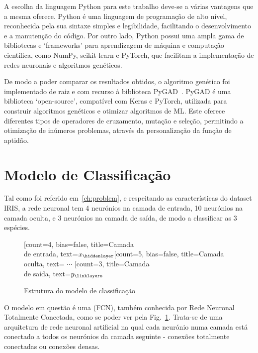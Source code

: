 A escolha da linguagem Python para este trabalho deve-se a várias vantagens que a mesma oferece.
Python é uma linguagem de programação de alto nível, reconhecida pela sua sintaxe simples e legibilidade, facilitando o desenvolvimento e a manutenção do código.
Por outro lado, Python possui uma ampla gama de bibliotecas e ‘frameworks’ para aprendizagem de máquina e computação científica, como NumPy, scikit-learn e PyTorch, que facilitam a implementação de redes neuronais e algoritmos genéticos.

De modo a poder comparar os resultados obtidos, o algoritmo genético foi implementado de raiz e com recurso à biblioteca PyGAD~\cite{Gad2021PyGAD:Library}.
PyGAD é uma biblioteca ‘open-source’, compatível com Keras e PyTorch, utilizada para construir algoritmos genéticos e otimizar algoritmos de ML. Este oferece diferentes tipos de operadores de cruzamento, mutação e seleção, permitindo a otimização de inúmeros problemas, através da personalização da função de aptidão.


\section{Modelo de Classificação}\label{sec:neural_net}

Tal como foi referido em~\ref{ch:problem}, e respeitando as características do dataset IRIS, a rede neuronal tem 4 neurónios na camada de entrada, 10 neurónios na camada oculta, e 3 neurónios na camada de saída, de modo a classificar as 3 espécies.

\begin{figure}[htbp]
    \centering
    \begin{neuralnetwork}[height=5]
        \newcommand{\x}[2]{$x_#2$}
        \newcommand{\y}[2]{$y_#2$}
        \newcommand{\h}[2]{\ifnum #2=4 $\cdots$ \else {\ifnum #2>4 $h_{10}$ \else $h_#2$ \fi} \fi}
        \newcommand{\hfirst}[2]{\small $h^{(1)}_#2$}
        [count=4, bias=false, title=Camada\\de entrada, text=\x]
        \hiddenlayer[count=5, bias=false, title=Camada oculta, text=\h] \linklayers
        \outputlayer[count=3, title=Camada\\de saída, text=\y] \linklayers
    \end{neuralnetwork}
    \caption{Estrutura do modelo de classificação}
    \label{fig:neural_net}
\end{figure}

O modelo em questão é uma  (FCN), também conhecida por Rede Neuronal Totalmente Conectada, como se poder ver pela Fig.~\ref{fig:neural_net}.
Trata-se de uma arquitetura de rede neuronal artificial na qual cada neurónio numa camada está conectado a todos os neurónios da camada seguinte - conexões totalmente conectadas ou conexões densas.

